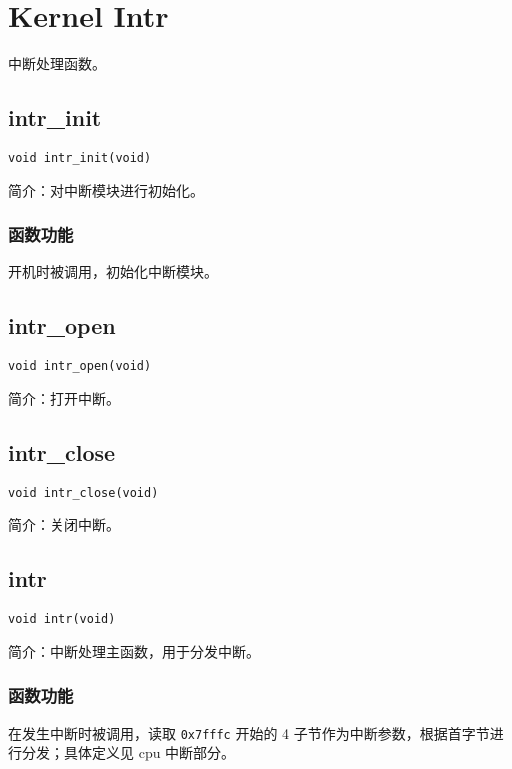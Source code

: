 %
%
%
%
%
%
%
%

\chapter{Kernel Intr}
中断处理函数。

\section{intr\_init}
\texttt{void intr\_init(void)}

简介：对中断模块进行初始化。

\subsection{函数功能}

开机时被调用，初始化中断模块。

\section{intr\_open}
\texttt{void intr\_open(void)}

简介：打开中断。

\section{intr\_close}
\texttt{void intr\_close(void)}

简介：关闭中断。

\section{intr}
\texttt{void intr(void)}

简介：中断处理主函数，用于分发中断。

\subsection{函数功能}

在发生中断时被调用，读取 \texttt{0x7fffc} 开始的 4 子节作为中断参数，根据首字节进行分发；具体定义见 cpu 中断部分。